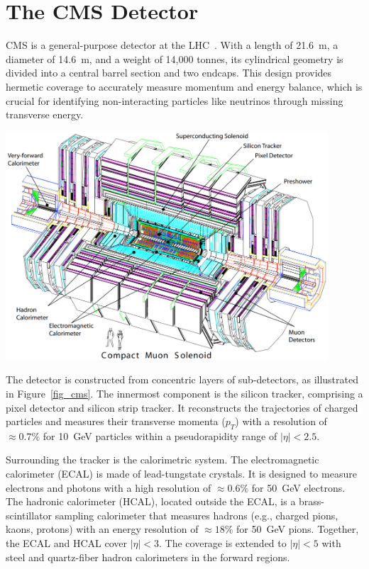 \section{The CMS Detector}

CMS is a general-purpose detector at the LHC~\parencite{CMS_2008}. With a length of 21.6~m, a diameter of 14.6~m, and a weight of 14,000 tonnes, its cylindrical geometry is divided into a central barrel section and two endcaps. This design provides hermetic coverage to accurately measure momentum and energy balance, which is crucial for identifying non-interacting particles like neutrinos through missing transverse energy.

\begin{center}
	\includegraphics[width=0.9\textwidth]{Images/CMS.png}
	\label{fig_cms}
\end{center}

The detector is constructed from concentric layers of sub-detectors, as illustrated in Figure~\ref{fig_cms}. The innermost component is the silicon tracker, comprising a pixel detector and silicon strip tracker. It reconstructs the trajectories of charged particles and measures their transverse momenta ($p_T$) with a resolution of $\approx 0.7\%$ for 10~GeV particles within a pseudorapidity range of $|\eta| < 2.5$.



Surrounding the tracker is the calorimetric system. The electromagnetic calorimeter (ECAL) is made of lead-tungstate crystals. It is designed to measure electrons and photons with a high resolution of $\approx 0.6\%$ for 50~GeV electrons. The hadronic calorimeter (HCAL), located outside the ECAL, is a brass-scintillator sampling calorimeter that measures hadrons (e.g., charged pions, kaons, protons) with an energy resolution of $\approx 18\%$ for 50~GeV pions. Together, the ECAL and HCAL cover $|\eta| < 3$. The coverage is extended to $|\eta| < 5$ with steel and quartz-fiber hadron calorimeters in the forward regions.

